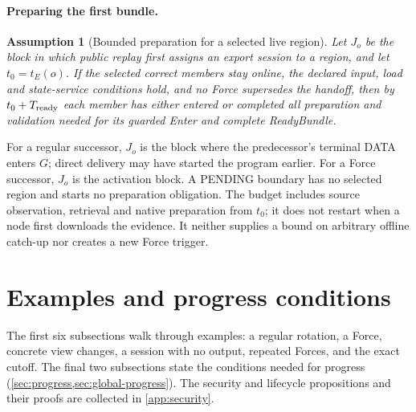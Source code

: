 \documentclass[11pt,a4paper]{article}
\newtheorem{assumption}[assumption]{Assumption}
\begin{document}
\paragraph{Preparing the first bundle.}
\begin{assumption}[Bounded preparation for a selected live region]
\label{ass:ready-service}
Let $J_o$ be the block in which public replay first assigns an export
session to a region, and let $t_0=t_E(o)$. If the selected correct
members stay online, the declared input, load and state-service
conditions hold, and no Force supersedes the handoff, then by
$t_0+T_{\rm ready}$ each member has either entered or completed all
preparation and validation needed for its guarded Enter and complete
ReadyBundle.
\end{assumption}
For a regular successor, $J_o$ is the block where the predecessor's
terminal DATA enters $G$; direct delivery may have started the program
earlier. For a Force successor, $J_o$ is the activation block.
A PENDING boundary has no selected region and starts no preparation
obligation. The budget includes source observation, retrieval and native
preparation from $t_0$; it does not restart when a node first downloads
the evidence. It neither supplies a bound on arbitrary offline catch-up
nor creates a new Force trigger.

\section{Examples and progress conditions}
\label{sec:examples}
The first six subsections walk through examples: a regular rotation, a
Force, concrete view changes, a session with no output, repeated Forces,
and the exact cutoff. The final two subsections state the conditions
needed for progress (\cref{sec:progress,sec:global-progress}).
The security and lifecycle propositions and their proofs are collected
in \cref{app:security}.
\end{document}
